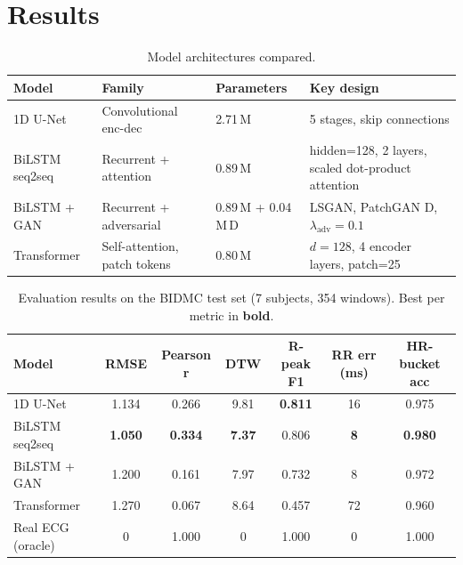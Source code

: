 \documentclass[11pt,a4paper]{article}
\begin{document}
\section{Results}

\begin{table}[H]
  \centering
  \caption{Model architectures compared.}
  \label{tab:archs}
  \small
  \begin{tabular}{p{2.6cm} p{3.2cm} p{2cm} p{4.5cm}}
    \toprule
    \textbf{Model} & \textbf{Family} & \textbf{Parameters} & \textbf{Key design} \\
    \midrule
    1D U-Net & Convolutional enc-dec & 2.71\,M & 5 stages, skip connections \\
    BiLSTM seq2seq & Recurrent + attention & 0.89\,M & hidden=128, 2 layers, scaled dot-product attention \\
    BiLSTM + GAN & Recurrent + adversarial & 0.89\,M + 0.04\,M\,D & LSGAN, PatchGAN D, $\lambda_\text{adv}=0.1$ \\
    Transformer & Self-attention, patch tokens & 0.80\,M & $d{=}128$, 4 encoder layers, patch=25 \\
    \bottomrule
  \end{tabular}
\end{table}

\begin{table}[H]
  \centering
  \caption{Evaluation results on the BIDMC test set (7 subjects, 354 windows). Best per metric in \textbf{bold}.}
  \label{tab:results}
  \small
  \begin{tabular}{lcccccc}
    \toprule
    \textbf{Model} & \textbf{RMSE} & \textbf{Pearson r} & \textbf{DTW} & \textbf{R-peak F1} & \textbf{RR err (ms)} & \textbf{HR-bucket acc} \\
    \midrule
    1D U-Net          & 1.134          & 0.266          & 9.81          & \textbf{0.811} & 16          & 0.975 \\
    BiLSTM seq2seq    & \textbf{1.050} & \textbf{0.334} & \textbf{7.37} & 0.806          & \textbf{8}  & \textbf{0.980} \\
    BiLSTM + GAN      & 1.200          & 0.161          & 7.97          & 0.732          & 8           & 0.972 \\
    Transformer       & 1.270          & 0.067          & 8.64          & 0.457          & 72          & 0.960 \\
    \midrule
    Real ECG (oracle) & 0              & 1.000          & 0             & 1.000          & 0           & 1.000 \\
    \bottomrule
  \end{tabular}
\end{table}
\end{document}

